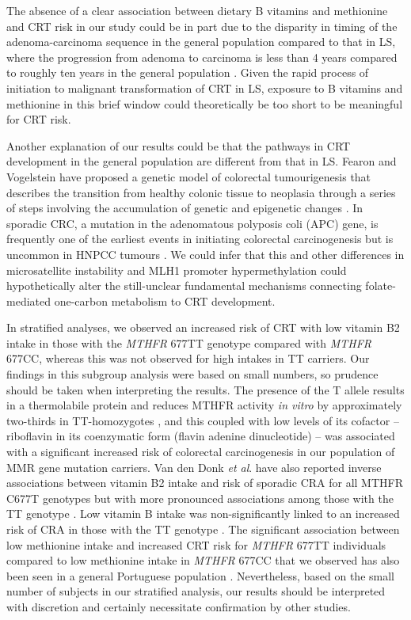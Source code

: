 \noindent The absence of a clear association between dietary B vitamins and methionine and CRT risk in our study could be in part due to the disparity in timing of the adenoma-carcinoma sequence in the general population compared to that in LS, where the progression from adenoma to carcinoma is less than 4 years \cite{c610,c644} compared to roughly ten years in the general population \cite{c645}. Given the rapid process of initiation to malignant transformation of CRT in LS, exposure to B vitamins and methionine in this brief window could theoretically be too short to be meaningful for CRT risk.

\noindent Another explanation of our results could be that the pathways in CRT development in the general population are different from that in LS. Fearon and Vogelstein have proposed a genetic model of colorectal tumourigenesis that describes the transition from healthy colonic tissue to neoplasia through a series of steps involving the accumulation of genetic and epigenetic changes \cite{c68}. In sporadic CRC, a mutation in the adenomatous polyposis coli (APC) gene, is frequently one of the earliest events in initiating colorectal carcinogenesis \cite{c646} but is uncommon in HNPCC tumours \cite{c647}. We could infer that this and other differences in microsatellite instability and MLH1 promoter hypermethylation could hypothetically alter the still-unclear fundamental mechanisms connecting folate-mediated one-carbon metabolism to CRT development.

\noindent In stratified analyses, we observed an increased risk of CRT with low vitamin B2 intake in those with the \emph{MTHFR} 677TT genotype compared with \emph{MTHFR} 677CC, whereas this was not observed for high intakes in TT carriers. Our findings in this subgroup analysis were based on small numbers, so prudence should be taken when interpreting the results. The presence of the T allele results in a thermolabile protein and reduces MTHFR activity \emph{in vitro} by approximately two-thirds in TT-homozygotes \cite{c648}, and this coupled with low levels of its cofactor -- riboflavin in its coenzymatic form (flavin adenine dinucleotide) -- was associated with a significant increased risk of colorectal carcinogenesis in our population of MMR gene mutation carriers. Van den Donk \emph{et al}. have also reported inverse associations between vitamin B2 intake and risk of sporadic CRA for all MTHFR C677T genotypes but with more pronounced associations among those with the TT genotype \cite{c621}. Low vitamin B intake was non-significantly linked to an increased risk of CRA in those with the TT genotype \cite{c621}. The significant association between low methionine intake and increased CRT risk for \emph{MTHFR} 677TT individuals compared to low methionine intake in \emph{MTHFR} 677CC that we observed has also been seen in a general Portuguese population \cite{c649}. Nevertheless, based on the small number of subjects in our stratified analysis, our results should be interpreted with discretion and certainly necessitate confirmation by other studies.

